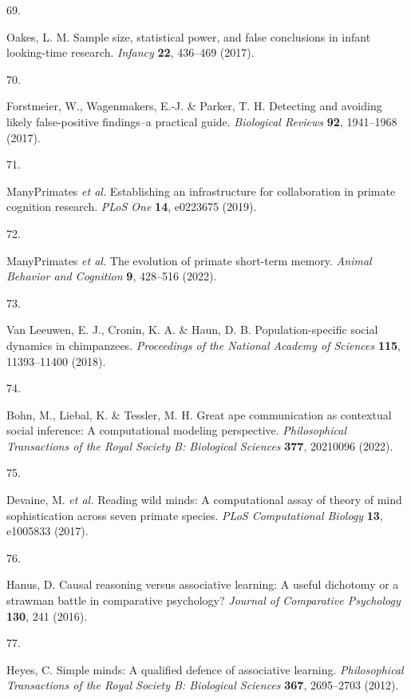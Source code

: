 \documentclass[
  man,floatsintext]{apa6}
\newlength{\cslhangindent}
\newlength{\csllabelwidth}
\newlength{\cslentryspacingunit} %
\newenvironment{CSLReferences}[2] %
 {%
  \setlength{\parindent}{0pt}
  \ifodd #1
  \let\oldpar\par
  \def\par{\hangindent=\cslhangindent\oldpar}
  \fi
  \setlength{\parskip}{#2\cslentryspacingunit}
 }%
 {}
\newcommand{\CSLLeftMargin}[1]{\parbox[t]{\csllabelwidth}{#1}}
\newcommand{\CSLRightInline}[1]{\parbox[t]{\linewidth - \csllabelwidth}{#1}\break}
\begin{document}
\begin{CSLReferences}{0}{0}
\leavevmode{}%
\CSLLeftMargin{69. }%
\CSLRightInline{Oakes, L. M. Sample size, statistical power, and false conclusions in infant looking-time research. \emph{Infancy} \textbf{22}, 436--469 (2017).}

\leavevmode{}%
\CSLLeftMargin{70. }%
\CSLRightInline{Forstmeier, W., Wagenmakers, E.-J. \& Parker, T. H. Detecting and avoiding likely false-positive findings--a practical guide. \emph{Biological Reviews} \textbf{92}, 1941--1968 (2017).}

\leavevmode{}%
\CSLLeftMargin{71. }%
\CSLRightInline{ManyPrimates \emph{et al.} Establishing an infrastructure for collaboration in primate cognition research. \emph{PLoS One} \textbf{14}, e0223675 (2019).}

\leavevmode{}%
\CSLLeftMargin{72. }%
\CSLRightInline{ManyPrimates \emph{et al.} The evolution of primate short-term memory. \emph{Animal Behavior and Cognition} \textbf{9}, 428--516 (2022).}

\leavevmode{}%
\CSLLeftMargin{73. }%
\CSLRightInline{Van Leeuwen, E. J., Cronin, K. A. \& Haun, D. B. Population-specific social dynamics in chimpanzees. \emph{Proceedings of the National Academy of Sciences} \textbf{115}, 11393--11400 (2018).}

\leavevmode{}%
\CSLLeftMargin{74. }%
\CSLRightInline{Bohn, M., Liebal, K. \& Tessler, M. H. Great ape communication as contextual social inference: A computational modeling perspective. \emph{Philosophical Transactions of the Royal Society B: Biological Sciences} \textbf{377}, 20210096 (2022).}

\leavevmode{}%
\CSLLeftMargin{75. }%
\CSLRightInline{Devaine, M. \emph{et al.} Reading wild minds: A computational assay of theory of mind sophistication across seven primate species. \emph{PLoS Computational Biology} \textbf{13}, e1005833 (2017).}

\leavevmode{}%
\CSLLeftMargin{76. }%
\CSLRightInline{Hanus, D. Causal reasoning versus associative learning: A useful dichotomy or a strawman battle in comparative psychology? \emph{Journal of Comparative Psychology} \textbf{130}, 241 (2016).}

\leavevmode{}%
\CSLLeftMargin{77. }%
\CSLRightInline{Heyes, C. Simple minds: A qualified defence of associative learning. \emph{Philosophical Transactions of the Royal Society B: Biological Sciences} \textbf{367}, 2695--2703 (2012).}


\end{CSLReferences}
\end{document}
